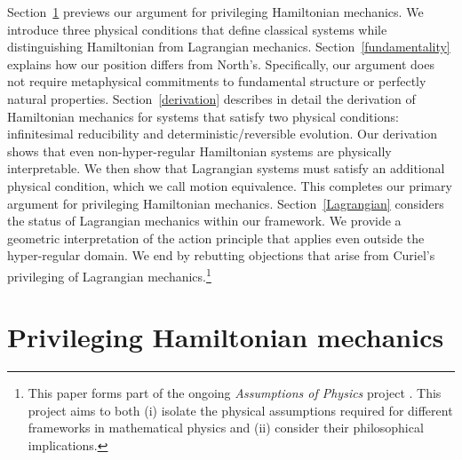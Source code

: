 \documentclass[12pt, twoside]{article}
\begin{document}
Section~\ref{privileging} previews our argument for privileging Hamiltonian mechanics. We introduce three physical conditions that define classical systems while distinguishing Hamiltonian from Lagrangian mechanics. Section~\ref{fundamentality} explains how our position differs from North's. Specifically, our argument does not require metaphysical commitments to fundamental structure or perfectly natural properties. Section~\ref{derivation} describes in detail the derivation of Hamiltonian mechanics for systems that satisfy two physical conditions: infinitesimal reducibility and deterministic/reversible evolution. Our derivation shows that even non-hyper-regular Hamiltonian systems are physically interpretable. We then show that Lagrangian systems must satisfy an additional physical condition, which we call motion equivalence. This completes our primary argument for privileging Hamiltonian mechanics. Section~\ref{Lagrangian} considers the status of Lagrangian mechanics within our framework. We provide a geometric interpretation of the action principle that applies even outside the hyper-regular domain. We end by rebutting objections that arise from Curiel's \parencites*[]{Curiel} privileging of Lagrangian mechanics.\footnote{This paper forms part of the ongoing \textit{Assumptions of Physics} project \parencites[]{aop-book}. This project aims to both (i) isolate the physical assumptions required for different frameworks in mathematical physics and (ii) consider their philosophical implications.} 


\section{Privileging Hamiltonian mechanics}
\label{privileging}
\end{document}

